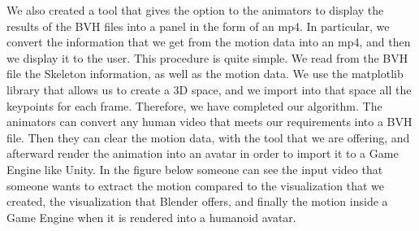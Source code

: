 We also created a tool that gives the option to the animators to display the results of the BVH files into a panel in the form of an mp4. In particular, we convert the information that we get from the motion data into an mp4, and then we display it to the user.  This procedure is quite simple. We read from the BVH file the Skeleton information, as well as the motion data. We use the matplotlib library that allows us to create a 3D space, and we import into that space all the keypoints for each frame. Therefore, we have completed our algorithm. The animators can convert any human video that meets our requirements into a BVH file. Then they can clear the motion data, with the tool that we are offering, and afterward render the animation into an avatar in order to import it to a Game Engine like Unity.  In the figure below someone can see the input video that someone wants to extract the motion compared to the visualization that we created, the visualization that Blender offers, and finally the motion inside a Game Engine when it is rendered into a humanoid avatar.

\pagebreak

